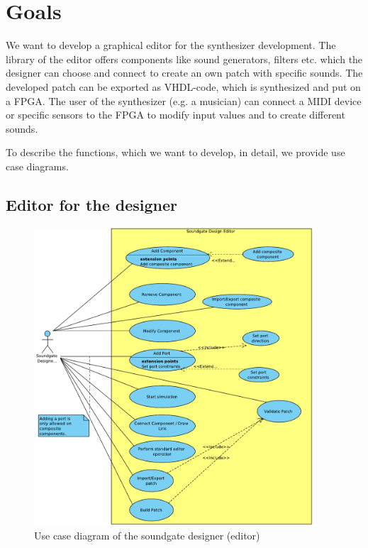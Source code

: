 \chapter{Goals}

We want to develop a graphical editor for the synthesizer development. The library of the editor offers components like sound generators, filters etc. which the designer can choose and connect to create an own patch with specific sounds. The developed patch can be exported as VHDL-code, which is synthesized and put on a FPGA. The user of the synthesizer (e.g. a musician) can connect a MIDI device or specific sensors to the FPGA to modify input values and to create different sounds. 

To describe the functions, which we want to develop, in detail, we provide use case diagrams.

\section{Editor for the designer}

	\begin{figure}[!h]
		\centering
			\includegraphics[width=0.93\textwidth]{images/Soundgate_Designer.pdf}
		\caption{Use case diagram of the soundgate designer (editor)}
		\label{fig:Soundgate_Designer}
	\end{figure}
	

